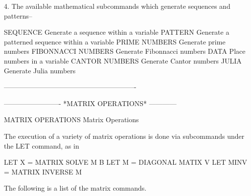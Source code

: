  
4. The available mathematical subcommands which generate sequences and
   patterns--
 
      SEQUENCE               Generate a sequence within a variable
      PATTERN                Generate a patterned sequence within a
                             variable
      PRIME NUMBERS          Generate prime numbers
      FIBONNACCI NUMBERS     Generate Fibonnacci numbers
      DATA                   Place numbers in a variable
      CANTOR NUMBERS         Generate Cantor numbers
      JULIA                  Generate Julia numbers
 
----------------------------------------------------------
 
 
 
 
 
 
 
 
 
 
 
 
 
 
 
 
 
 
 
 
 
 
 
 
 
 
 
 
 
 
 
 
 
 
 
 
 
 
 
 
 
 
 
 
 
 
 
 
 
 
 
 
-------------------------  *MATRIX OPERATIONS*  ------------
 
MATRIX OPERATIONS
Matrix Operations
 
The execution of a variety of matrix operations is done via
subcommands under the LET command, as in
 
   LET X = MATRIX SOLVE M B
   LET M = DIAGONAL MATIX V
   LET MINV = MATRIX INVERSE M
 
The following is a list of the matrix commands.
 
